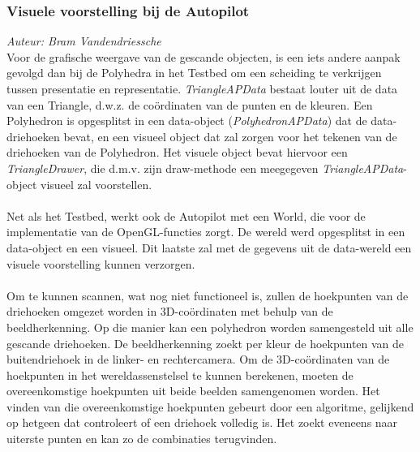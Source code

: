 \subsubsection{Visuele voorstelling bij de Autopilot}
{\em Auteur: Bram Vandendriessche}\\

\noindent
Voor de grafische weergave van de gescande objecten, is een iets andere aanpak gevolgd dan bij de Polyhedra in het Testbed om een scheiding te verkrijgen tussen presentatie en representatie. \textit{TriangleAPData} bestaat louter uit de data van een Triangle, d.w.z. de co\"ordinaten van de punten en de kleuren. Een Polyhedron is opgesplitst in een data-object (\textit{PolyhedronAPData}) dat de data-driehoeken bevat, en een visueel object dat zal zorgen voor het tekenen van de driehoeken van de Polyhedron. Het visuele object bevat hiervoor een \textit{TriangleDrawer}, die d.m.v. zijn draw-methode een meegegeven \textit{TriangleAPData}-object visueel zal voorstellen.\\
~\\
\noindent
Net als het Testbed, werkt ook de Autopilot met een World, die voor de implementatie van de OpenGL-functies zorgt. De wereld werd opgesplitst in een data-object en een visueel. Dit laatste zal met de gegevens uit de data-wereld een visuele voorstelling kunnen verzorgen.\\
~\\
\noindent
Om te kunnen scannen, wat nog niet functioneel is, zullen de hoekpunten van de driehoeken omgezet worden in 3D-co\"ordinaten met behulp van de beeldherkenning. Op die manier kan een polyhedron worden samengesteld uit alle gescande driehoeken. De beeldherkenning zoekt per kleur de hoekpunten van de buitendriehoek in de linker- en rechtercamera. Om de 3D-co\"ordinaten van de hoekpunten in het wereldassenstelsel te kunnen berekenen, moeten de overeenkomstige hoekpunten uit beide beelden samengenomen worden. Het vinden van die overeenkomstige hoekpunten gebeurt door een algoritme, gelijkend op hetgeen dat controleert of een driehoek volledig is. Het zoekt eveneens naar uiterste punten en kan zo de combinaties terugvinden.  